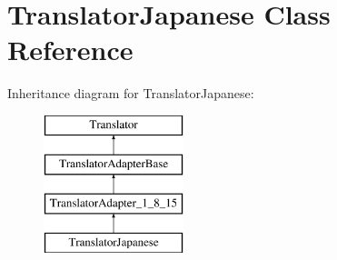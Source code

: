 \hypertarget{class_translator_japanese}{}\section{Translator\+Japanese Class Reference}
\label{class_translator_japanese}
Inheritance diagram for Translator\+Japanese\+:\begin{figure}[H]
\begin{center}
\leavevmode
\includegraphics[height=4.000000cm]{class_translator_japanese}
\end{center}
\end{figure}
